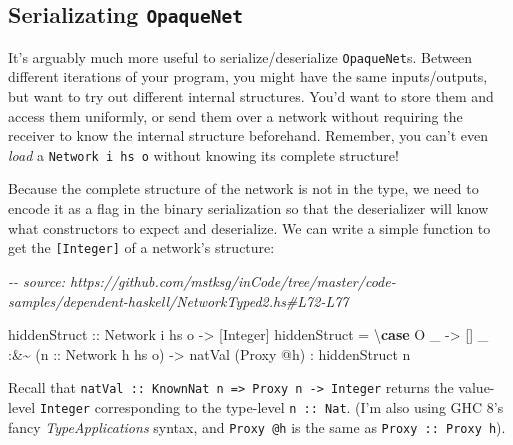 \documentclass[]{article}
\newenvironment{Shaded}{}{}
\newcommand{\CommentTok}[1]{\textcolor[rgb]{0.38,0.63,0.69}{\textit{#1}}}
\newcommand{\DataTypeTok}[1]{\textcolor[rgb]{0.56,0.13,0.00}{#1}}
\newcommand{\KeywordTok}[1]{\textcolor[rgb]{0.00,0.44,0.13}{\textbf{#1}}}
\newcommand{\NormalTok}[1]{#1}
\newcommand{\OperatorTok}[1]{\textcolor[rgb]{0.40,0.40,0.40}{#1}}
\newcommand{\OtherTok}[1]{\textcolor[rgb]{0.00,0.44,0.13}{#1}}
\begin{document}
\subsection{\texorpdfstring{Serializating
\texttt{OpaqueNet}}{Serializating OpaqueNet}}\label{serializating-opaquenet}

It's arguably much more useful to serialize/deserialize \texttt{OpaqueNet}s.
Between different iterations of your program, you might have the same
inputs/outputs, but want to try out different internal structures. You'd want to
store them and access them uniformly, or send them over a network without
requiring the receiver to know the internal structure beforehand. Remember, you
can't even \emph{load} a \texttt{Network\ i\ hs\ o} without knowing its complete
structure!

Because the complete structure of the network is not in the type, we need to
encode it as a flag in the binary serialization so that the deserializer will
know what constructors to expect and deserialize. We can write a simple function
to get the \texttt{{[}Integer{]}} of a network's structure:

\begin{Shaded}
\begin{Highlighting}[]
\CommentTok{{-}{-} source: https://github.com/mstksg/inCode/tree/master/code{-}samples/dependent{-}haskell/NetworkTyped2.hs\#L72{-}L77}

\OtherTok{hiddenStruct ::} \DataTypeTok{Network}\NormalTok{ i hs o }\OtherTok{{-}\textgreater{}}\NormalTok{ [}\DataTypeTok{Integer}\NormalTok{]}
\NormalTok{hiddenStruct }\OtherTok{=}\NormalTok{ \textbackslash{}}\KeywordTok{case}
    \DataTypeTok{O}\NormalTok{ \_    }\OtherTok{{-}\textgreater{}}\NormalTok{ []}
\NormalTok{    \_ }\OperatorTok{:\&\textasciitilde{}}\NormalTok{ (}\OtherTok{n\textquotesingle{} ::} \DataTypeTok{Network}\NormalTok{ h hs\textquotesingle{} o)}
           \OtherTok{{-}\textgreater{}}\NormalTok{ natVal (}\DataTypeTok{Proxy} \OperatorTok{@}\NormalTok{h)}
            \OperatorTok{:}\NormalTok{ hiddenStruct n\textquotesingle{}}
\end{Highlighting}
\end{Shaded}

Recall that
\texttt{natVal\ ::\ KnownNat\ n\ =\textgreater{}\ Proxy\ n\ -\textgreater{}\ Integer}
returns the value-level \texttt{Integer} corresponding to the type-level
\texttt{n\ ::\ Nat}. (I'm also using GHC 8's fancy \emph{TypeApplications}
syntax, and \texttt{Proxy\ @h} is the same as \texttt{Proxy\ ::\ Proxy\ h}).
\end{document}
